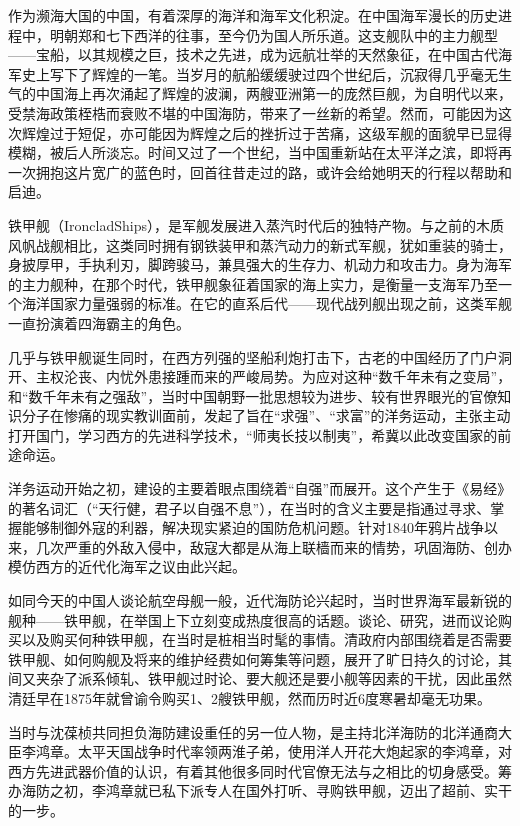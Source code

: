 \documentclass[12pt,UTF8]{ctexbook}
\begin{document}
作为濒海大国的中国，有着深厚的海洋和海军文化积淀。在中国海军漫长的历史进程中，明朝郑和七下西洋的往事，至今仍为国人所乐道。这支舰队中的主力舰型——宝船，以其规模之巨，技术之先进，成为远航壮举的天然象征，在中国古代海军史上写下了辉煌的一笔。当岁月的航船缓缓驶过四个世纪后，沉寂得几乎毫无生气的中国海上再次涌起了辉煌的波澜，两艘亚洲第一的庞然巨舰，为自明代以来，受禁海政策桎梏而衰败不堪的中国海防，带来了一丝新的希望。然而，可能因为这次辉煌过于短促，亦可能因为辉煌之后的挫折过于苦痛，这级军舰的面貌早已显得模糊，被后人所淡忘。时间又过了一个世纪，当中国重新站在太平洋之滨，即将再一次拥抱这片宽广的蓝色时，回首往昔走过的路，或许会给她明天的行程以帮助和启迪。

铁甲舰（IroncladShips），是军舰发展进入蒸汽时代后的独特产物。与之前的木质风帆战舰相比，这类同时拥有钢铁装甲和蒸汽动力的新式军舰，犹如重装的骑士，身披厚甲，手执利刃，脚跨骏马，兼具强大的生存力、机动力和攻击力。身为海军的主力舰种，在那个时代，铁甲舰象征着国家的海上实力，是衡量一支海军乃至一个海洋国家力量强弱的标准。在它的直系后代——现代战列舰出现之前，这类军舰一直扮演着四海霸主的角色。

几乎与铁甲舰诞生同时，在西方列强的坚船利炮打击下，古老的中国经历了门户洞开、主权沦丧、内忧外患接踵而来的严峻局势。为应对这种“数千年未有之变局”，和“数千年未有之强敌”，当时中国朝野一批思想较为进步、较有世界眼光的官僚知识分子在惨痛的现实教训面前，发起了旨在“求强”、“求富”的洋务运动，主张主动打开国门，学习西方的先进科学技术，“师夷长技以制夷”，希冀以此改变国家的前途命运。

洋务运动开始之初，建设的主要着眼点围绕着“自强”而展开。这个产生于《易经》的著名词汇（“天行健，君子以自强不息”），在当时的含义主要是指通过寻求、掌握能够制御外寇的利器，解决现实紧迫的国防危机问题。针对1840年鸦片战争以来，几次严重的外敌入侵中，敌寇大都是从海上联樯而来的情势，巩固海防、创办模仿西方的近代化海军之议由此兴起。

如同今天的中国人谈论航空母舰一般，近代海防论兴起时，当时世界海军最新锐的舰种——铁甲舰，在举国上下立刻变成热度很高的话题。谈论、研究，进而议论购买以及购买何种铁甲舰，在当时是桩相当时髦的事情。清政府内部围绕着是否需要铁甲舰、如何购舰及将来的维护经费如何筹集等问题，展开了旷日持久的讨论，其间又夹杂了派系倾轧、铁甲舰过时论、要大舰还是要小舰等因素的干扰，因此虽然清廷早在1875年就曾谕令购买1、2艘铁甲舰，然而历时近6度寒暑却毫无功果。

当时与沈葆桢共同担负海防建设重任的另一位人物，是主持北洋海防的北洋通商大臣李鸿章。太平天国战争时代率领两淮子弟，使用洋人开花大炮起家的李鸿章，对西方先进武器价值的认识，有着其他很多同时代官僚无法与之相比的切身感受。筹办海防之初，李鸿章就已私下派专人在国外打听、寻购铁甲舰，迈出了超前、实干的一步。
\end{document}
